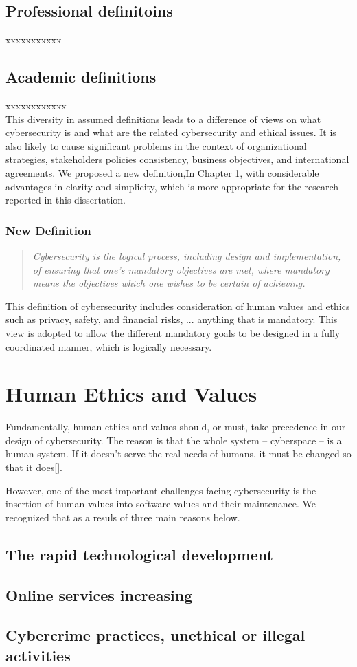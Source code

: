 \subsection{Professional definitoins}
xxxxxxxxxxx
\subsection{Academic definitions}
xxxxxxxxxxxx
\\

This diversity in assumed definitions leads to a difference of views on what cybersecurity is and what are the related cybersecurity and ethical issues. It is also likely to cause significant problems in the context of organizational strategies, stakeholders policies consistency, business objectives, and international agreements. We proposed a new definition,In Chapter 1, with considerable advantages in clarity and simplicity, 
which is more appropriate for the research reported in this dissertation.

\subsubsection*{New Definition}
\begin{quote} \em Cybersecurity is the logical process, including design and implementation, of ensuring that one's mandatory objectives are met, where mandatory means the objectives which one wishes to be certain of achieving.\end{quote}

This definition of cybersecurity includes consideration of human values and ethics such as privacy, safety, and financial risks, ... anything that is mandatory. This view is adopted to allow the different mandatory goals
to be designed in a fully coordinated manner, which is logically necessary.

\section{Human Ethics and Values}
Fundamentally, human ethics and values should, or must, take precedence in our design of cybersecurity. The reason is that the whole system -- cyberspace -- is a human system. If it doesn't serve the real needs of humans, it must be changed so that it does[]. 

However, one of the most important challenges facing cybersecurity is the insertion of human values into software values and their maintenance.  We recognized  that as a resuls of three  main reasons below. 
\subsection {The rapid technological development}

\subsection  {Online services increasing}

 
\subsection {Cybercrime practices, unethical or illegal activities}





